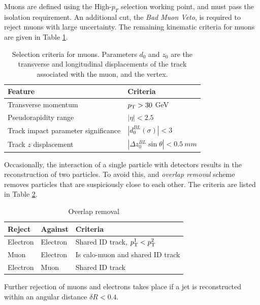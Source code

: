 Muons are defined using the High-$p_T$ selection working point, and must pass the  isolation requirement.
An additional cut, the \emph{Bad Muon Veto}, is required to reject muons with large \pt uncertainty.
The remaining kinematic criteria for muons are given in Table \ref{tab:ciMuonsSel}.

\begin{table}[ht]
\caption{Selection criteria for muons. Parameters $d_{0}$ and $z_{0}$ are the transverse and longitudinal displacements of the track associated with the muon, and the vertex.}
\begin{center}
    \begin{tabular}[ht]{l l}
    \toprule
    Feature & Criteria \\
    \midrule
    Transverse momentum  & $p_\text{T}>30$ GeV\\
    Pseudorapidity range & $|\eta|<2.5$ \\
    Track impact parameter significance & $|d_{0}^{BL}(\sigma)|< 3$ \\
    Track $z$ displacement  & $|\Delta z_{0}^{BL} \sin{\theta}| < 0.5~mm$\\
    \bottomrule
    \end{tabular}
\end{center}
\label{tab:ciMuonsSel}
\end{table}

Occasionally, the interaction of a single particle with detectors results in the reconstruction of two particles.
To avoid this, and \emph{overlap removal} scheme removes particles that are suspiciously close to each other.
The criteria are listed in Table \ref{tab:ciOr}.
\begin{table}[ht]
\caption{Overlap removal}
\begin{center}
    \begin{tabular}[ht]{l l l}
    \toprule
    Reject & Against & Criteria \\
    \midrule
    Electron & Electron & Shared ID track, $p_\text{T}^1<p_\text{T}^2$ \\
    Muon     & Electron & Is calo-muon and shared ID track \\
    Electron & Muon     & Shared ID track \\
    \bottomrule
    \end{tabular}
\end{center}
\label{tab:ciOr}
\end{table}
Further rejection of muons and electrons takes place if a jet is reconstructed within an angular distance $\delta R<0.4$.

